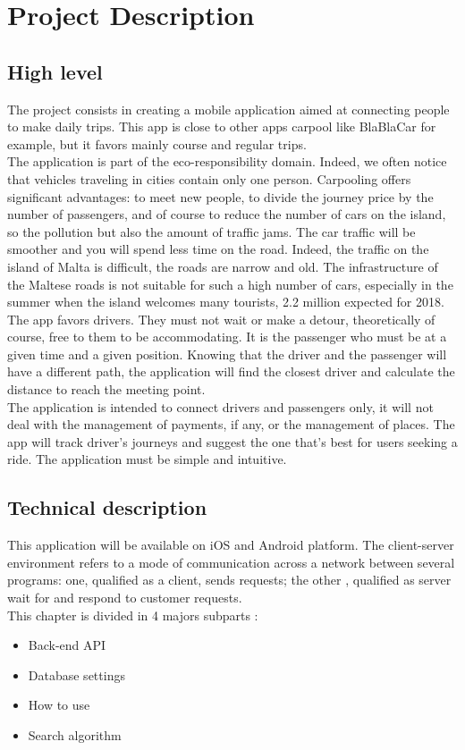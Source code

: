 \part{Project Description}

\chapter{High level}
The project consists in creating a mobile application aimed at connecting people to make daily trips. This app is close to other apps carpool like BlaBlaCar for example, but it favors mainly course and regular trips.
\\The application is part of the eco-responsibility domain. Indeed, we often notice that vehicles traveling in cities contain only one person. Carpooling offers significant advantages: to meet new people, to divide the journey price by the number of passengers, and of course to reduce the number of cars on the island, so the pollution but also the amount of traffic jams. The car traffic will be smoother and you will spend less time on the road. Indeed, the traffic on the island of Malta is difficult, the roads are narrow and old. The infrastructure of the Maltese roads is not suitable for such a high number of cars, especially in the summer when the island welcomes many tourists, 2.2 million expected for 2018.
\\The app favors drivers. They must not wait or make a detour, theoretically of course, free to them to be accommodating. It is the passenger who must be at a given time and a given position. Knowing that the driver and the passenger will have a different path, the application will find the closest driver and calculate the distance to reach the meeting point.
\\The application is intended to connect drivers and passengers only, it will not deal with the management of payments, if any, or the management of places. The app will track driver's journeys and suggest the one that's best for users seeking a ride. The application must be simple and intuitive.

\chapter{Technical description}
This application will be available on iOS and Android platform. The client-server environment refers to a mode of communication across a network between several programs: one, qualified as a client, sends requests; the other , qualified as server wait for and respond to customer requests.\\This chapter is divided in 4 majors subparts :
\begin{itemize}
    \item Back-end API
    \item Database settings
    \item How to use
    \item Search algorithm
\end{itemize}

